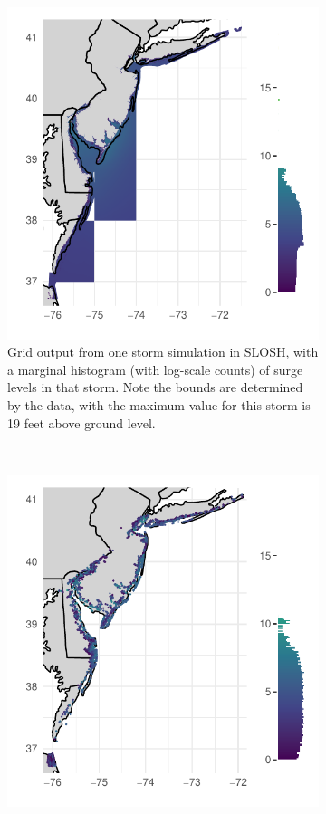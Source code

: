 \begin{figure}[t!]
    \centering
    \begin{subfigure}[t]{0.48\textwidth}
        \centering
        \includegraphics[width=0.99\linewidth]{./plots/slosh1run}
        \caption{Grid output from one storm simulation in SLOSH, with a marginal
            histogram (with log-scale counts) of surge levels in that storm.  Note
            the bounds are determined by the data, with the maximum value for this
            storm is 19 feet above ground level.\label{fig:slosh1run}}
    \end{subfigure}%
    ~ 
    \begin{subfigure}[t]{0.48\textwidth}
        \centering
        \includegraphics[width=0.99\linewidth]{./plots/sloshthreshold}

\end{subfigure}
\end{figure}
